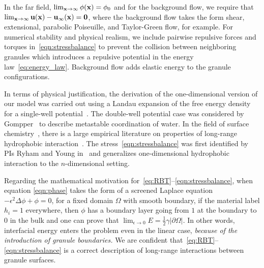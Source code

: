 In the far field, $\lim_{\mathbf{x} \to \infty} \phi(\mathbf{x}) = \phi_0$ and for the
background flow, we require that $\lim_{\mathbf{x} \to \infty} \mathbf{u}(\mathbf{x}) -
\mathbf{u}_{\infty}(\mathbf{x}) = \mathbf{0}$, where
the background flow takes the form
shear, extensional, parabolic Poiseuille, and
Taylor-Green flow, for example.
For numerical stability and physical realism, we
include pairwise repulsive forces and torques
in~\eqref{eqn:stressbalance} to prevent the collision between
neighboring granules which introduces a repulsive potential in the energy
law~\eqref{eq:energy_law}. Background flow adds elastic energy to the
granule configurations.

In terms of physical justification, the derivation of the
one-dimensional version of our model was carried out using a Landau
expansion of the free energy density for a single-well
potential~\cite{MaRa76, ErLjCl89}. The double-well potential case was
considered by Gompper~\cite{GoHaKo94} to describe metastable
coordination of water. In the field of surface
chemistry~\cite{Israelachvili1954}, there is a large empirical
literature on properties of long-range hydrophobic
interaction~\cite{LeRaPa77, KoNa15, Nagle17, Lum1999, Lin2005,
Meyer2006, Ducker2016, Jackson2016, Gletal88, Aketal17, Ch05}. The
stress~\eqref{eqn:stressbalance} was first identified by PIs Ryham and
Young in~\cite{Fu2018_SIAM} and generalizes one-dimensional hydrophobic
interaction to the $n$-dimensional setting. 

Regarding the mathematical motivation for~\eqref{eq:RBT}--\eqref{eqn:stressbalance},
when equation \eqref{eqn:phase} takes the form of a screened Laplace equation
$-\epsilon^2 \Delta \phi + \phi =0$, for a fixed domain $\Omega$ with
smooth boundary, if the material label $h_i = 1$
everywhere, then $\phi$ has a boundary layer going from $1$ at the
boundary to $0$ in the bulk and one can prove that 
$\lim_{\epsilon \to 0} E = \frac{1}{2}\gamma |\partial \Omega|$.
In other words, 
interfacial energy enters the problem even in the linear case,
\emph{because of the introduction of granule boundaries.}
We are confident
that~\eqref{eq:RBT}--\eqref{eqn:stressbalance} is a correct description
of long-range interactions between granule surfaces.


